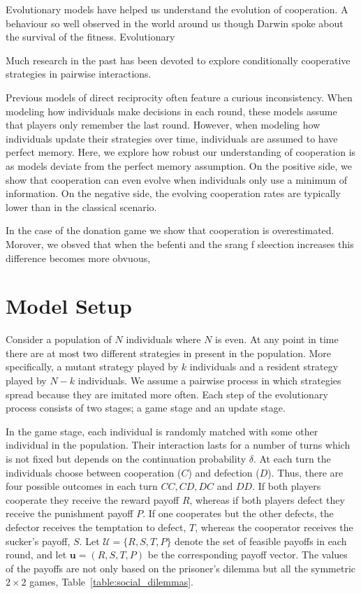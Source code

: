 \documentclass[11pt]{article}
\theoremstyle{plainCl1}
\theoremstyle{plainCl2}
\begin{document}
Evolutionary models have helped us understand the evolution of cooperation.
A behaviour so well observed in the world around us though Darwin spoke
about the survival of the fitness. Evolutionary

Much research in the past has been devoted to explore conditionally cooperative
strategies in pairwise interactions.

Previous models of direct reciprocity often feature a curious inconsistency.
When modeling how individuals make decisions in each round, these models assume
that players only remember the last round. However, when modeling how
individuals update their strategies over time, individuals are assumed to have
perfect memory. Here, we explore how robust our understanding of cooperation is
as models deviate from the perfect memory assumption. On the positive side, we
show that cooperation can even evolve when individuals only use a minimum of
information. On the negative side, the evolving cooperation rates are typically
lower than in the classical scenario.

In the case of the donation game we show that cooperation is overestimated.
Morover, we obsved that when the befenti and the srang f sleection increases this
difference becomes more obvuous, 


\appendix

\section{Model Setup}\label{appendix:methods}

Consider a population of \(N\) individuals where \(N\) is even. At any point in
time there are at most two different strategies in present in the population.
More specifically, a mutant strategy played by \(k\) individuals and a resident
strategy played by \(N - k\) individuals. We assume a pairwise process in which
strategies spread because they are imitated more often. Each step of the
evolutionary process consists of two stages; a game stage and an update stage.

In the game stage, each individual is randomly matched with some other
individual in the population. Their interaction lasts for a number of turns
which is not fixed but depends on the continuation probability \(\delta\). At
each turn the individuals choose between cooperation (\(C\)) and defection
(\(D\)). Thus, there are four possible outcomes in each turn \(CC, CD, DC\) and
\(DD\). If both players cooperate they receive the reward payoff \(R\), whereas
if both players defect they receive the punishment payoff \(P\). If one
cooperates but the other defects, the defector receives the temptation to
defect, \(T\), whereas the cooperator receives the sucker's payoff, \(S\).
Let $\mathcal{U}=\{R,S,T,P\}$ denote the set of feasible payoffs in each round,
and let $\mathbf{u}\!=\!(R,S,T,P)$ be the corresponding payoff vector.
The values of the payoffs are not only based on the prisoner's dilemma but all
the symmetric \(2 \times 2\) games, Table~\ref{table:social_dilemmas}.
\end{document}
